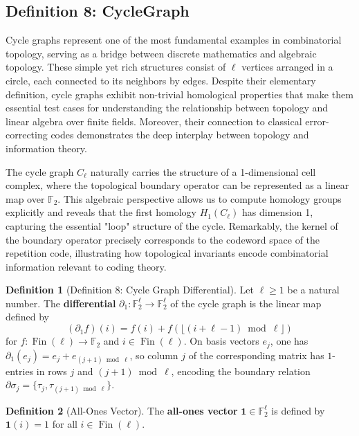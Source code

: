 \documentclass[11pt]{article}
\theoremstyle{plain}
\theoremstyle{definition}
\newtheorem*{definition}{Definition}
\theoremstyle{remark}
\begin{document}
\vspace{1em}

\subsection{Definition 8: CycleGraph}

Cycle graphs represent one of the most fundamental examples in combinatorial topology, serving as a bridge between discrete mathematics and algebraic topology. These simple yet rich structures consist of $\ell$ vertices arranged in a circle, each connected to its neighbors by edges. Despite their elementary definition, cycle graphs exhibit non-trivial homological properties that make them essential test cases for understanding the relationship between topology and linear algebra over finite fields. Moreover, their connection to classical error-correcting codes demonstrates the deep interplay between topology and information theory.

The cycle graph $C_\ell$ naturally carries the structure of a 1-dimensional cell complex, where the topological boundary operator can be represented as a linear map over $\mathbb{F}_2$. This algebraic perspective allows us to compute homology groups explicitly and reveals that the first homology $H_1(C_\ell)$ has dimension 1, capturing the essential "loop" structure of the cycle. Remarkably, the kernel of the boundary operator precisely corresponds to the codeword space of the repetition code, illustrating how topological invariants encode combinatorial information relevant to coding theory.

\begin{definition}[Definition 8: Cycle Graph Differential]
Let $\ell \geq 1$ be a natural number. The \textbf{differential} $\partial_1 : \mathbb{F}_2^\ell \to \mathbb{F}_2^\ell$ of the cycle graph is the linear map defined by
\[
(\partial_1 f)(i) = f(i) + f\!\left(\lfloor(i + \ell - 1) \bmod \ell\rfloor\right)
\]
for $f : \operatorname{Fin}(\ell) \to \mathbb{F}_2$ and $i \in \operatorname{Fin}(\ell)$. On basis vectors $e_j$, one has $\partial_1(e_j) = e_j + e_{(j+1) \bmod \ell}$, so column $j$ of the corresponding matrix has $1$-entries in rows $j$ and $(j+1) \bmod \ell$, encoding the boundary relation $\partial\sigma_j = \{\tau_j, \tau_{(j+1) \bmod \ell}\}$.
\end{definition}

\begin{definition}[All-Ones Vector]
The \textbf{all-ones vector} $\mathbf{1} \in \mathbb{F}_2^\ell$ is defined by $\mathbf{1}(i) = 1$ for all $i \in \operatorname{Fin}(\ell)$.
\end{definition}
\end{document}
